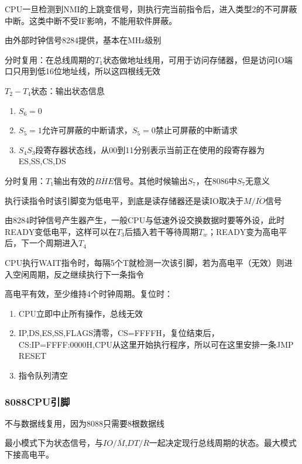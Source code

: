 CPU一旦检测到NMI的上跳变信号，则执行完当前指令后，进入类型2的不可屏蔽中断。这类中断不受IF影响，不能用软件屏蔽。

由外部时钟信号8284提供，基本在MHz级别

分时复用：在总线周期的$T_1$状态做地址线用，可用于访问存储器，但是访问IO端口只用到低16位地址线，所以这四根线无效

$T_2-T_4$状态：输出状态信息
\begin{enumerate}
    \item $S_6=0$
    \item $S_5=1$允许可屏蔽的中断请求，$S_5=0$禁止可屏蔽的中断请求
    \item $S_4S_3$段寄存器状态线，从00到11分别表示当前正在使用的段寄存器为ES,SS,CS,DS
\end{enumerate}
分时复用：$T_1$输出有效的$\overline{BHE}$信号。其他时候输出$S_7$，在8086中$S_7$无意义


执行读指令时该引脚变为低电平，到底是读存储器还是读IO取决于$M/\overline{IO}$信号

由8284时钟信号产生器产生，一般CPU与低速外设交换数据时要等外设，此时READY变低电平，这样可以在$T_3$后插入若干等待周期$T_w$；READY变为高电平后，下一个周期进入$T_4$

CPU执行WAIT指令时，每隔5个T就检测一次该引脚，若为高电平（无效）则进入空闲周期，反之继续执行下一条指令

高电平有效，至少维持4个时钟周期。复位时：
\begin{enumerate}
    \item CPU立即中止所有操作，总线无效
    \item IP,DS,ES,SS,FLAGS清零，CS=FFFFH，复位结束后，CS:IP=FFFF:0000H,CPU从这里开始执行程序，所以可在这里安排一条JMP RESET
    \item 指令队列清空
\end{enumerate}
\subsubsection{8088CPU引脚}
不与数据线复用，因为8088只需要8根数据线

最小模式下为状态信号，与$IO/\overline{M}$,$DT/\overline{R}$一起决定现行总线周期的状态。最大模式下接高电平。

